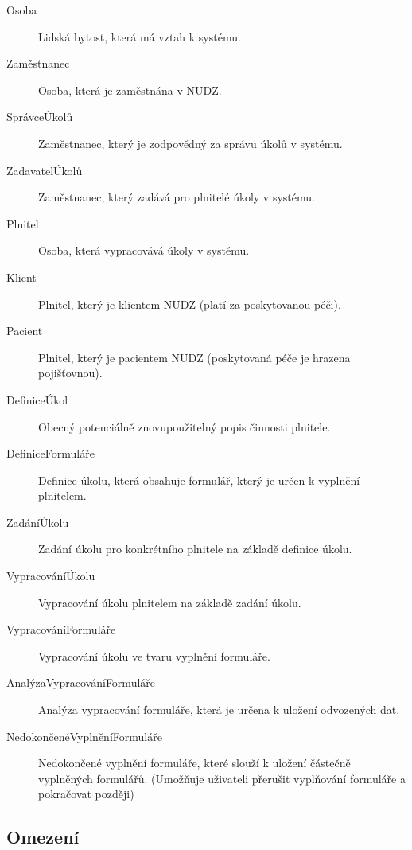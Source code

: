 \begin{description}
\item[Osoba]
  Lidská bytost, která má vztah k systému.

\item[Zaměstnanec]
  Osoba, která je zaměstnána v NUDZ\@.

\item[SprávceÚkolů]
  Zaměstnanec, který je zodpovědný za správu úkolů v systému.

\item[ZadavatelÚkolů]
  Zaměstnanec, který zadává pro plnitelé úkoly v systému.

\item[Plnitel]
  Osoba, která vypracovává úkoly v systému.

\item[Klient]
  Plnitel, který je klientem NUDZ (platí za poskytovanou péči).

\item[Pacient]
  Plnitel, který je pacientem NUDZ (poskytovaná péče je hrazena pojišťovnou).

\item[DefiniceÚkol]
  Obecný potenciálně znovupoužitelný popis činnosti plnitele.

\item[DefiniceFormuláře]
  Definice úkolu, která obsahuje formulář, který je určen k vyplnění plnitelem.

\item[ZadáníÚkolu]
  Zadání úkolu pro konkrétního plnitele na základě definice úkolu.

\item[VypracováníÚkolu]
  Vypracování úkolu plnitelem na základě zadání úkolu.

\item[VypracováníFormuláře]
  Vypracování úkolu ve tvaru vyplnění formuláře.

\item[AnalýzaVypracováníFormuláře]
  Analýza vypracování formuláře, která je určena k uložení odvozených dat.

\item[NedokončenéVyplněníFormuláře]
  Nedokončené vyplnění formuláře, které slouží k uložení částečně vyplněných formulářů.
  (Umožňuje uživateli přerušit vyplňování formuláře a pokračovat později)

\end{description}

\subsection{Omezení}\label{subsec:omezeni}


